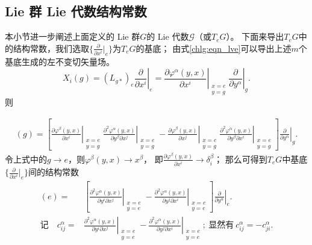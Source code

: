 

\subsection{ Lie 群 Lie 代数结构常数}\label{chlg:sec_structure-constants}
本小节进一步阐述上面定义的 Lie 群$G$的 Lie 代数$\mathscr{G}$（或$T_eG$）。
下面来导出$T_eG$中的结构常数，我们选取$\{\frac{\partial}{\partial x^i}|_{e}\}$为$T_eG$的基底；
由式\eqref{chlg:eqn_lve}可以导出上述$m$个基底生成的左不变切矢量场。
\begin{equation}
    X_i(g)=(L_{g*})_e \left.\frac{\partial }{\partial x^i}\right|_e 
    = \left. \frac{\partial \varphi^\alpha (y,x)}{\partial x^i} 
    \right|_{\substack{x=e\\y=g}}  \left. \frac{\partial}{\partial y^\alpha}\right|_{g} .
\end{equation}
则

\begin{align*}
    [X_i, X_j](g)= \left[ \left. \frac{\partial \varphi^\beta (y,x)}{\partial x^i} \right| _{\substack{x=e\\y=g}}
    \left. \frac{\partial^2 \varphi^\alpha (y,x)}{\partial y^\beta \partial x^j} \right|_{\substack{x=e\\y=g}} 
    -\left. \frac{\partial \varphi^\beta (y,x)}{\partial x^j} \right| _{\substack{x=e\\y=g}}
    \left. \frac{\partial^2 \varphi^\alpha (y,x)}{\partial y^\beta \partial x^i} \right|_{\substack{x=e\\y=g}} 
    \right] \left. \frac{\partial}{\partial y^\alpha}\right|_{g} .
\end{align*}
令上式中的$g\to e$，则$\varphi^\beta(y,x) \to x^\beta$，
即$\frac{\partial \varphi^\beta (y,x)}{\partial x^i}\to \delta^\beta_i$；
那么可得到$T_eG$中基底$\{\frac{\partial}{\partial x^i}|_{e}\}$间的结构常数
\begin{align}
    [X_i, X_j](e)=& \left[ \left. \frac{\partial^2 \varphi^\alpha (y,x)}{\partial y^i \partial x^j} \right|_{\substack{x=e\\y=e}} 
    -\left. \frac{\partial^2 \varphi^\alpha (y,x)}{\partial y^j \partial x^i} \right|_{\substack{x=e\\y=e}} 
    \right] \left. \frac{\partial}{\partial y^\alpha}\right|_{e} . \\
    \text{记}\quad 
    c^\alpha_{ij}=&\left. \frac{\partial^2 \varphi^\alpha (y,x)}{\partial y^i \partial x^j} \right|_{\substack{x=e\\y=e}} -\left. 
    \frac{\partial^2 \varphi^\alpha (y,x)}{\partial y^j \partial x^i} \right|_{\substack{x=e\\y=e}};
    \ \text{显然有}\  c^\alpha_{ij} = -c^\alpha_{ji} .\label{chlg:eqn_struc-const}
\end{align}


